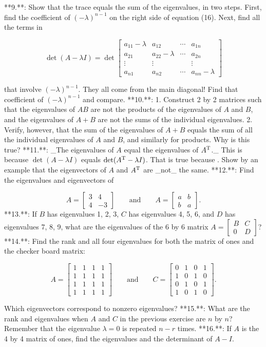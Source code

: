 

**9.**: Show that the trace equals the sum of the eigenvalues, in two steps. First, find the coefficient of \((-\lambda)^{n-1}\) on the right side of equation (16). Next, find all the terms in

\[\det(A-\lambda I)=\det\begin{bmatrix}a_{11}-\lambda&a_{12}&\cdots&a_{1n}\\ a_{21}&a_{22}-\lambda&\cdots&a_{2n}\\ \vdots&\vdots&&\vdots\\ a_{n1}&a_{n2}&\cdots&a_{nn}-\lambda\end{bmatrix}\]

that involve \((-\lambda)^{n-1}\). They all come from the main diagonal! Find that coefficient of \((-\lambda)^{n-1}\) and compare.
**10.**:
1. Construct 2 by 2 matrices such that the eigenvalues of \(AB\) are not the products of the eigenvalues of \(A\) and \(B\), and the eigenvalues of \(A+B\) are not the sums of the individual eigenvalues.
2. Verify, however, that the sum of the eigenvalues of \(A+B\) equals the sum of all the individual eigenvalues of \(A\) and \(B\), and similarly for products. Why is this true?
**11.**: _The eigenvalues of \(A\) equal the eigenvalues of \(A^{\rm T}\)._ This is because \(\det(A-\lambda I)\) equals \(\det(A^{\rm T}-\lambda I)\). That is true because . Show by an example that the eigenvectors of \(A\) and \(A^{\rm T}\) are _not_ the same.
**12.**: Find the eigenvalues and eigenvectors of

\[A=\begin{bmatrix}3&4\\ 4&-3\end{bmatrix}\qquad\text{and}\qquad A=\begin{bmatrix}a&b\\ b&a\end{bmatrix}.\]
**13.**: If \(B\) has eigenvalues 1, 2, 3, \(C\) has eigenvalues 4, 5, 6, and \(D\) has eigenvalues 7, 8, 9, what are the eigenvalues of the 6 by 6 matrix \(A=\begin{bmatrix}B&C\\ 0&D\end{bmatrix}\)?
**14.**: Find the rank and all four eigenvalues for both the matrix of ones and the checker board matrix:

\[A=\begin{bmatrix}1&1&1&1\\ 1&1&1&1\\ 1&1&1&1\\ 1&1&1&1\end{bmatrix}\qquad\text{and}\qquad C=\begin{bmatrix}0&1&0&1\\ 1&0&1&0\\ 0&1&0&1\\ 1&0&1&0\end{bmatrix}.\]

Which eigenvectors correspond to nonzero eigenvalues?
**15.**: What are the rank and eigenvalues when \(A\) and \(C\) in the previous exercise are \(n\) by \(n\)? Remember that the eigenvalue \(\lambda=0\) is repeated \(n-r\) times.
**16.**: If \(A\) is the 4 by 4 matrix of ones, find the eigenvalues and the determinant of \(A-I\).

